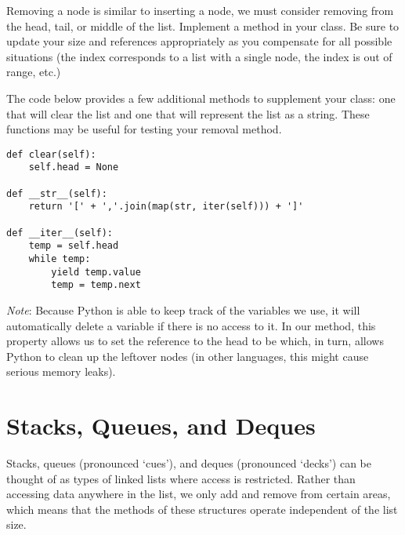 \begin{problem}
Removing a node is similar to inserting a node, we must consider removing from the head, tail, or middle of the list.
Implement a  method in your  class.
Be sure to update your size and references appropriately as you compensate for all possible situations (the index corresponds to a list with a single node, the index is out of range, etc.)

The code below provides a few additional methods to supplement your  class: one that will clear the list and one that will represent the list as a string.
These functions may be useful for testing your removal method.
\begin{lstlisting}
def clear(self):
    self.head = None

def __str__(self):
    return '[' + ','.join(map(str, iter(self))) + ']'

def __iter__(self):
    temp = self.head
    while temp:
        yield temp.value
        temp = temp.next
\end{lstlisting}
\emph{Note}: Because Python is able to keep track of the variables we use, it will automatically delete a variable if there is no access to it.
In our  method, this property allows us to set the reference to the head to be  which, in turn, allows Python to clean up the leftover nodes (in other languages, this might cause serious memory leaks).
\label{prob:LinkedList}
\end{problem}

\section*{Stacks, Queues, and Deques}
Stacks, queues (pronounced `cues'), and deques (pronounced `decks') can be thought of as types of linked lists where access is restricted.
Rather than accessing data anywhere in the list, we only add and remove from certain areas, which means that the methods of these structures operate independent of the list size.

